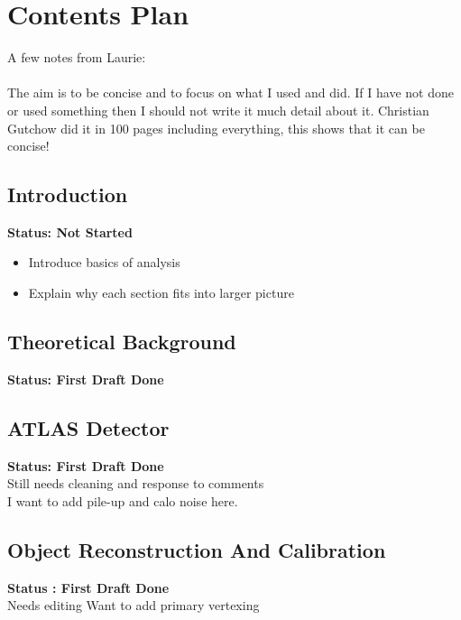 %
%
%
\chapter{Contents Plan}

\noindent
A few notes from Laurie:\\
\indent\\
The aim is to be concise and to focus on what I used and did.
If I have not done or used something then I should not write it much detail about it.
Christian Gutchow did it in 100 pages including everything, this shows that it can be concise!

\section{Introduction}

\textbf{Status: Not Started}

\begin{itemize}
  \item{Introduce basics of analysis}
  \item{Explain why each section fits into larger picture}
\end{itemize}

\section{Theoretical Background}

\textbf{Status: First Draft Done}\\

\section{ATLAS Detector}

\textbf{Status: First Draft Done}\\
\noindent
Still needs cleaning and response to comments\\
I want to add pile-up and calo noise here.\\
\noindent

\section{Object Reconstruction And Calibration}

\textbf{Status : First Draft Done}\\
\noindent
Needs editing
Want to add primary vertexing\\

